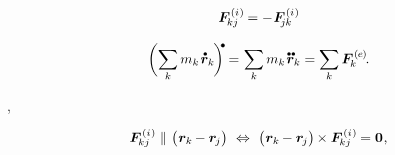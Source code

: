 \nopagebreak\vspace{-0.12em}\begin{equation}\label{actionreactionprinciple}
\bm{F}^{\smthinternal}_{\hspace{-0.16ex}kj} = - \hspace{.12ex} \bm{F}^{\smthinternal}_{\hspace{-0.4ex}j\hspace{-0.05ex}k}
\end{equation}

\vspace{-0.15em}\noindent
{} 

\nopagebreak\ru{\vspace{-0.1em}}\begin{equation}\label{balanceoftranslationalmomentum.discrete}
\biggl( \displaystyle \sum_{\smash{k}} m_k \hspace{.2ex} \mathdotabove{\locationvector}_k \hspace{-0.2ex} \biggr)^{\hspace{-0.2em}\tikz[baseline=-0.2ex]\draw[black, fill=black] (0,0) circle (.28ex);} \hspace{-0.15ex}
= \hspace{.12ex} \displaystyle \sum_{\smash{k}} m_k \hspace{.2ex} \mathdotdotabove{\locationvector}_k
= \displaystyle \sum_{\smash{k}} \bm{F}^{\smthexternal}_{\hspace{-0.16ex}k}
\hspace{-0.15ex} .
\end{equation}

\vspace{-0.1em}
   , 

\nopagebreak\vspace{-0.25em}\begin{equation*}
\bm{F}^{\smthinternal}_{\hspace{-0.16ex}kj} \hspace{.15ex} \parallel \hspace{.1ex} \bigl( \hspace{.1ex} \locationvector_k \hspace{-0.15ex} - \locationvector_{\hspace{-0.16ex}j} \bigr)
\hspace{.33em} \Leftrightarrow \hspace{.33em}
\bigl( \hspace{.1ex} \locationvector_k \hspace{-0.15ex} - \locationvector_{\hspace{-0.16ex}j} \bigr) \hspace{-0.15ex} \times \bm{F}^{\smthinternal}_{\hspace{-0.16ex}kj} = \bm{0}
\hspace{.1ex} ,
\end{equation*}

